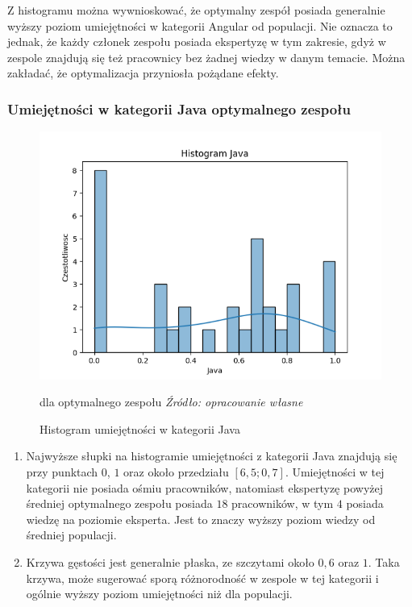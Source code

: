         \par Z histogramu można wywnioskować, że optymalny zespół posiada generalnie wyższy poziom umiejętności w kategorii Angular od populacji. Nie oznacza to jednak, że każdy członek zespołu posiada ekspertyzę w tym zakresie, gdyż w zespole znajdują się też pracownicy bez żadnej wiedzy w danym temacie. Można zakładać, że optymalizacja przyniosła pożądane efekty.
        
        \subsubsection{Umiejętności w kategorii Java optymalnego zespołu}
        \begin{figure}[H]
            \centering
            \includegraphics[width=\linewidth]{chapters/Images/hist_java_optimal.png}
            \cprotect\caption{Histogram umiejętności w kategorii Java} dla optymalnego zespołu
            \textit{Źródło: opracowanie własne} 
            \label{fig:hist_java_optimal}
        \end{figure}

        \begin{enumerate}
            \item Najwyższe słupki na histogramie umiejętności z kategorii Java znajdują się przy punktach $0$, $1$ oraz około przedziału $[6,5; 0,7]$. Umiejętności w tej kategorii nie posiada ośmiu pracowników, natomiast ekspertyzę powyżej średniej optymalnego zespołu posiada $18$ pracowników, w tym $4$ posiada wiedzę na poziomie eksperta. Jest to znaczy wyższy poziom wiedzy od średniej populacji.
            \item Krzywa gęstości jest generalnie płaska, ze szczytami około $0,6$ oraz $1$. Taka krzywa, może sugerować sporą różnorodność w zespole w tej kategorii i ogólnie wyższy poziom umiejętności niż dla populacji.
        \end{enumerate}


